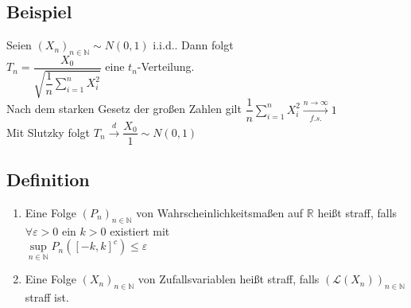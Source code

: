 \documentclass[german,10pt,oneside, fleqn, a4paper]{article}
\newcommand {\R}	{\mathbb{R}}
\newcommand {\N}	{\mathbb{N}}
\newcommand{\sm}[2][\infty]{\sum\limits_{#2}^{#1}}
\newcommand{\folge}[3][\N]{\left(#2_#3\right)_{#3\in #1}}
\newcommand{\mc}[1]{\mathcal{#1}}
\newcommand{\toinf}{\rightarrow\infty}
\newcommand{\1}[1]{1_{#1}}
\newcommand{\2}[1]{\1{\brac{#1}}}
\newcommand{\xr}[2][]{\xrightarrow[#1]{#2}}
\begin{document}
\subsection{Beispiel}
\label{3.13}
Seien $\folge{X}{n}\sim N(0,1)$ i.i.d.. Dann folgt\\
$T_n=\dfrac{X_0}{\sqrt{\dfrac{1}{n}\sm[n]{i=1}X_i^2}}$ eine $t_n$-Verteilung.\\
Nach dem starken Gesetz der großen Zahlen gilt $\dfrac{1}{n}\sm[n]{i=1}X_i^2\xr[f.s.]{n\toinf}1$\\
Mit Slutzky folgt $T_n\xr{d}\dfrac{X_0}{1}\sim N(0,1)$

\subsection{Definition}
\label{3.14}
\begin{enumerate}[label=(\alph*)]
\item Eine Folge $\folge{P}{n}$ von Wahrscheinlichkeitsmaßen auf $\R$ heißt straff, falls $\forall\varepsilon>0$ ein $k>0$ existiert mit\\
$\sup\limits_{n\in\N}P_n([-k,k]^c)\leq\varepsilon$
\item Eine Folge $\folge{X}{n}$ von Zufallsvariablen heißt straff, falls $(\mc{L}(X_n))_{n\in\N}$ straff ist.
\end{enumerate}
\end{document}
